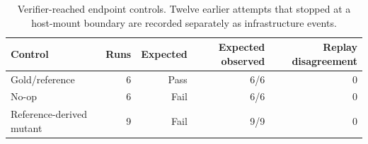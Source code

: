 
\begin{table}[H]
\centering
\caption{Verifier-reached endpoint controls. Twelve earlier attempts that stopped at a host-mount boundary are recorded separately as infrastructure events.}
\label{tab:controls}
\small
\begin{tabular}{@{}lrrrr@{}}
\toprule
Control & Runs & Expected & Expected observed & Replay disagreement \\
\midrule
Gold/reference & 6 & Pass & 6/6 & 0 \\
No-op & 6 & Fail & 6/6 & 0 \\
Reference-derived mutant & 9 & Fail & 9/9 & 0 \\
\bottomrule
\end{tabular}
\end{table}
